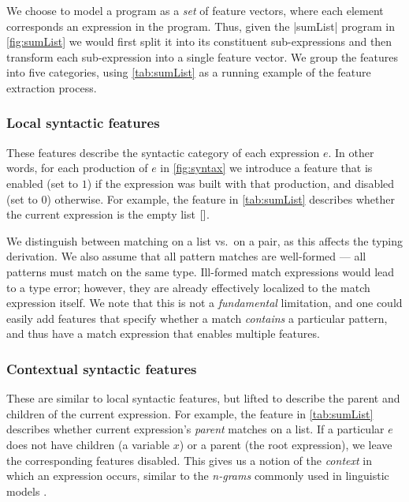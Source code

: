 We choose to model a program as a \emph{set} of feature vectors, where
each element corresponds an expression in the program.
%
Thus, given the |sumList| program in \autoref{fig:sumList} we
would first split it into its constituent sub-expressions and then
transform each sub-expression into a single feature vector.
%
We group the features into five categories, using \autoref{tab:sumList}
as a running example of the feature extraction process.

\subsubsection{Local syntactic features}
These features describe the syntactic category of each expression $e$.
%
In other words, for each production of $e$ in \autoref{fig:syntax} we
introduce a feature that is enabled (set to $1$) if the expression was
built with that production, and disabled (set to $0$) otherwise.
%
For example, the \IsNil feature in \autoref{tab:sumList} describes
whether the current expression is the empty list $\mathtt{[]}$.

We distinguish between matching on a list vs.\ on a pair, as this
affects the typing derivation.
%
We also assume that all pattern matches are well-formed --- \ie all
patterns must match on the same type.
%
Ill-formed match expressions would lead to a type error; however, they
are already effectively localized to the match expression itself.
%
We note that this is not a \emph{fundamental} limitation, and one could
easily add features that specify whether a match \emph{contains} a
particular pattern, and thus have a match expression that enables multiple
features.

\subsubsection{Contextual syntactic features}
These are similar to local syntactic features, but lifted to describe the
parent and children of the current expression.
%
For example, the \IsCaseListP feature in \autoref{tab:sumList} describes
whether current expression's \emph{parent} matches on a list.
%
If a particular $e$ does not have children (\eg a variable $x$) or a
parent (\ie the root expression), we leave the corresponding features
disabled.
%
This gives us a notion of the \emph{context} in which an expression
occurs, similar to the \emph{n-grams} commonly used in linguistic
models \citep{Hindle2012-hf,Gabel2010-el}.



